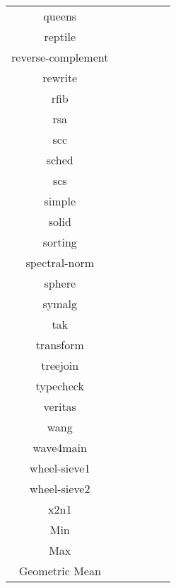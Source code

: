 \begin{tabular}{ c c c c c c }
queens &  &  &  &  & \\
reptile &  &  &  &  & \\
reverse-complement &  &  &  &  & \\
rewrite &  &  &  &  & \\
rfib &  &  &  &  & \\
rsa &  &  &  &  & \\
scc &  &  &  &  & \\
sched &  &  &  &  & \\
scs &  &  &  &  & \\
simple &  &  &  &  & \\
solid &  &  &  &  & \\
sorting &  &  &  &  & \\
spectral-norm &  &  &  &  & \\
sphere &  &  &  &  & \\
symalg &  &  &  &  & \\
tak &  &  &  &  & \\
transform &  &  &  &  & \\
treejoin &  &  &  &  & \\
typecheck &  &  &  &  & \\
veritas &  &  &  &  & \\
wang &  &  &  &  & \\
wave4main &  &  &  &  & \\
wheel-sieve1 &  &  &  &  & \\
wheel-sieve2 &  &  &  &  & \\
x2n1 &  &  &  &  & \\
\hline
Min &  &  &  &  & \\
Max &  &  &  &  & \\
Geometric Mean &  &  &  &  & \\


\end{tabular}
\begin{verbatim}

\end{verbatim}
